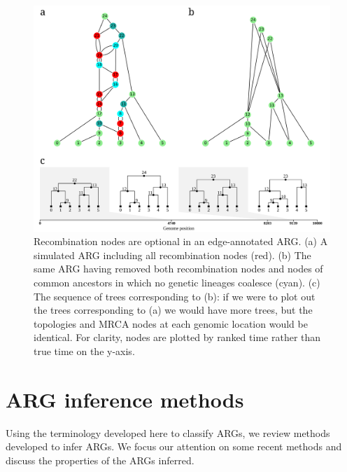 \documentclass{article}
\begin{document}
\begin{figure}
\centering
\vspace{5em}
\includegraphics[width=\linewidth]{illustrations/ARG_recomb_node_deletion}
\caption{\label{fig-recombinati on-nodes}
Recombination nodes are optional in an edge-annotated ARG. (a) A simulated
ARG including all recombination nodes (red). (b) The same ARG having removed both
recombination nodes and nodes of common ancestors in which no genetic
lineages coalesce (cyan). (c) The sequence of trees corresponding to (b): if we were
to plot out the trees corresponding to (a) we would have more trees, but the topologies
and MRCA nodes at each genomic location would be identical. For clarity, nodes are
plotted by ranked time rather than true time on the y-axis.
}
\end{figure}


\section*{ARG inference methods}
Using the terminology developed here to classify ARGs, we review methods developed
to infer ARGs. We focus our attention on some recent methods and discuss the
properties of the ARGs inferred.
\end{document}
